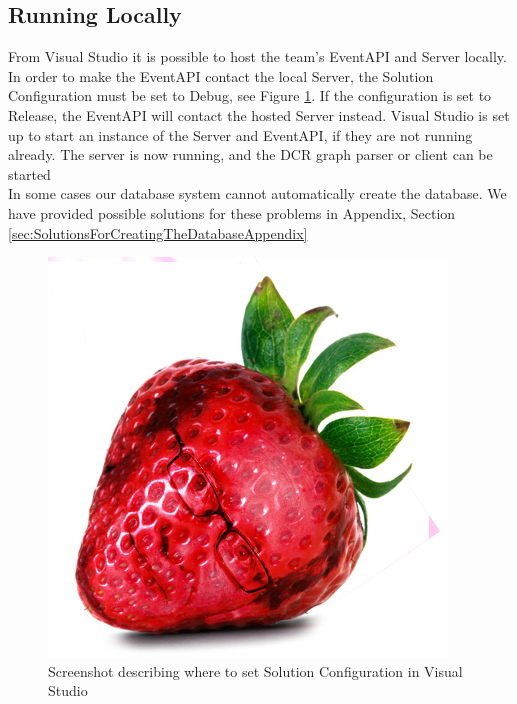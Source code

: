 \subsection{Running Locally\label{sec:RunningLocally}}
From Visual Studio it is possible to host the team’s EventAPI and Server locally. In order to make the EventAPI contact the local Server, the Solution Configuration must be set to Debug, see Figure \ref{fig:DebugModeScreenshot}. If the configuration is set to Release, the EventAPI will contact the hosted Server instead. \newline
Visual Studio is set up to start an instance of the Server and EventAPI, if they are not running already. The server is now running, and the DCR graph parser or client can be started \\

In some cases our database system cannot automatically create the database. We have provided possible solutions for these problems in Appendix, Section \ref{sec:SolutionsForCreatingTheDatabaseAppendix} 

\begin{figure}[h!]
\centering
\includegraphics[width=0.4\linewidth]{Figures/strawberry}
\caption{\label{fig:DebugModeScreenshot} Screenshot describing where to set Solution Configuration in Visual Studio}
\end{figure}